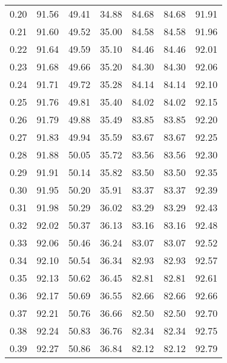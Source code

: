 \begin{tabular}{|c|c|c|c|c|c|c|}
      0.20 &     91.56 &     49.41 &      34.88 &   84.68 &      84.68 &         91.91 \\
      0.21 &     91.60 &     49.52 &      35.00 &   84.58 &      84.58 &         91.96 \\
      0.22 &     91.64 &     49.59 &      35.10 &   84.46 &      84.46 &         92.01 \\
      0.23 &     91.68 &     49.66 &      35.20 &   84.30 &      84.30 &         92.06 \\
      0.24 &     91.71 &     49.72 &      35.28 &   84.14 &      84.14 &         92.10 \\
      0.25 &     91.76 &     49.81 &      35.40 &   84.02 &      84.02 &         92.15 \\
      0.26 &     91.79 &     49.88 &      35.49 &   83.85 &      83.85 &         92.20 \\
      0.27 &     91.83 &     49.94 &      35.59 &   83.67 &      83.67 &         92.25 \\
      0.28 &     91.88 &     50.05 &      35.72 &   83.56 &      83.56 &         92.30 \\
      0.29 &     91.91 &     50.14 &      35.82 &   83.50 &      83.50 &         92.35 \\
      0.30 &     91.95 &     50.20 &      35.91 &   83.37 &      83.37 &         92.39 \\
      0.31 &     91.98 &     50.29 &      36.02 &   83.29 &      83.29 &         92.43 \\
      0.32 &     92.02 &     50.37 &      36.13 &   83.16 &      83.16 &         92.48 \\
      0.33 &     92.06 &     50.46 &      36.24 &   83.07 &      83.07 &         92.52 \\
      0.34 &     92.10 &     50.54 &      36.34 &   82.93 &      82.93 &         92.57 \\
      0.35 &     92.13 &     50.62 &      36.45 &   82.81 &      82.81 &         92.61 \\
      0.36 &     92.17 &     50.69 &      36.55 &   82.66 &      82.66 &         92.66 \\
      0.37 &     92.21 &     50.76 &      36.66 &   82.50 &      82.50 &         92.70 \\
      0.38 &     92.24 &     50.83 &      36.76 &   82.34 &      82.34 &         92.75 \\
      0.39 &     92.27 &     50.86 &      36.84 &   82.12 &      82.12 &         92.79 \\

\end{tabular}
